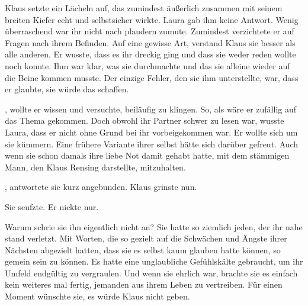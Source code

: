 Klaus setzte ein Lächeln auf, das zumindest äußerlich zusammen mit seinem breiten Kiefer echt und selbstsicher wirkte. Laura gab ihm keine Antwort. Wenig überraschend war ihr nicht nach plaudern zumute. Zumindest verzichtete er auf Fragen nach ihrem Befinden. Auf eine gewisse Art, verstand Klaus sie besser als alle anderen. Er wusste, dass es ihr dreckig ging und dass sie weder reden wollte noch konnte. Ihm war klar, was sie durchmachte und das sie alleine wieder auf die Beine kommen musste. Der einzige Fehler, den sie ihm unterstellte, war, dass er glaubte, sie würde das schaffen.

\par

, wollte er wissen und versuchte, beiläufig zu klingen. So, als wäre er zufällig auf das Thema gekommen. Doch obwohl ihr Partner schwer zu lesen war, wusste Laura, dass er nicht ohne Grund bei ihr vorbeigekommen war. Er wollte sich um sie kümmern. Eine frühere Variante ihrer selbst hätte sich darüber gefreut. Auch wenn sie schon damals ihre liebe Not damit gehabt hatte, mit dem stämmigen Mann, den Klaus Rensing darstellte, mitzuhalten.

\par

, antwortete sie kurz angebunden. Klaus grinste nun. 

\par

Sie seufzte.  Er nickte nur. 

\par

Warum schrie sie ihn eigentlich nicht an? Sie hatte so ziemlich jeden, der ihr nahe stand verletzt. Mit Worten, die so gezielt auf die Schwächen und Ängste ihrer Nächsten abgezielt hatten, dass sie es selbst kaum glauben hatte können, so gemein sein zu können. Es hatte eine unglaubliche Gefühlskälte gebraucht, um ihr Umfeld endgültig zu vergraulen. Und wenn sie ehrlich war, brachte sie es einfach kein weiteres mal fertig, jemanden aus ihrem Leben zu vertreiben. Für einen Moment wünschte sie, es würde Klaus nicht geben.

\par


